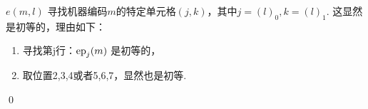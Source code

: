 \begin{pf} \rm \;
    $e(m, l)$ 寻找机器编码$m$的特定单元格$(j, k)$，其中$j = (l)_0, k = (l)_1$.
    这显然是初等的，理由如下：
    \begin{enumerate}
        \item 寻找第j行：$\mathrm{ep}_j(m)$ 是初等的，
        \item 取位置2,3,4或者5,6,7，显然也是初等.
    \end{enumerate}
    \qed
\end{pf}